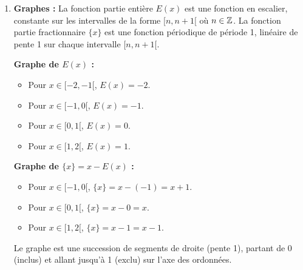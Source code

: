 \documentclass[solutions]{exercices}
\begin{document}
\begin{solution}
	\begin{enumerate}
		\item \textbf{Graphes :}
		      La fonction partie entière $E(x)$ est une fonction en escalier, constante sur les intervalles de la forme $[n, n+1[$ où $n \in \mathbb{Z}$.
		      La fonction partie fractionnaire $\{x\}$ est une fonction périodique de période 1, linéaire de pente 1 sur chaque intervalle $[n, n+1[$.


		      \textbf{Graphe de $E(x)$ :}
		      \begin{itemize}
			      \item Pour $x \in [-2, -1[$, $E(x) = -2$.
			      \item Pour $x \in [-1, 0[$, $E(x) = -1$.
			      \item Pour $x \in [0, 1[$, $E(x) = 0$.
			      \item Pour $x \in [1, 2[$, $E(x) = 1$.
		      \end{itemize}

		      \textbf{Graphe de $\{x\} = x-E(x)$ :}
		      \begin{itemize}
			      \item Pour $x \in [-1, 0[$, $\{x\} = x - (-1) = x+1$.
			      \item Pour $x \in [0, 1[$, $\{x\} = x - 0 = x$.
			      \item Pour $x \in [1, 2[$, $\{x\} = x - 1 = x-1$.
		      \end{itemize}
		      Le graphe est une succession de segments de droite (pente 1), partant de 0 (inclus) et allant jusqu'à 1 (exclu) sur l'axe des ordonnées.


\end{enumerate}
\end{solution}
\end{document}
